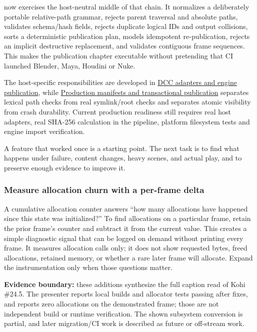  now exercises the host-neutral middle of that chain. It normalizes a deliberately portable relative-path grammar, rejects parent traversal and absolute paths, validates schema/hash fields, rejects duplicate logical IDs and output collisions, sorts a deterministic publication plan, models idempotent re-publication, rejects an implicit destructive replacement, and validates contiguous frame sequences. This makes the publication chapter executable without pretending that CI launched Blender, Maya, Houdini or Nuke.

The host-specific responsibilities are developed in \hyperref[appendix-03ade9e1875f]{DCC adapters and engine publication}, while \hyperref[appendix-91eaa3cbdbc3]{Production manifests and transactional publication} separates lexical path checks from real symlink/root checks and separates atomic visibility from crash durability. Current production readiness still requires real host adapters, real SHA-256 calculation in the pipeline, platform filesystem tests and engine import verification.

A feature that worked once is a starting point. The next task is to find what happens under failure, content changes, heavy scenes, and actual play, and to preserve enough evidence to improve it.

\subsubsection{Measure allocation churn with a per-frame delta}\label{06-engine-ii-ch041-measure-allocation-churn-with-a-per-frame-delta}

\hypertarget{06-engine-ii-ch041-measure-allocation-churn-with-a-per-frame-delta}{}

A cumulative allocation counter answers ``how many allocations have happened since this state was initialized?'' To find allocations on a particular frame, retain the prior frame's counter and subtract it from the current value. This creates a simple diagnostic signal that can be logged on demand without printing every frame. It measures allocation calls only; it does not show requested bytes, freed allocations, retained memory, or whether a rare later frame will allocate. Expand the instrumentation only when those questions matter.

\textbf{Evidence boundary:} these additions synthesize the full caption read of Kohi \#24.5. The presenter reports local builds and allocator tests passing after fixes, and reports zero allocations on the demonstrated frame; those are not independent build or runtime verification. The shown subsystem conversion is partial, and later migration/CI work is described as future or off-stream work.

